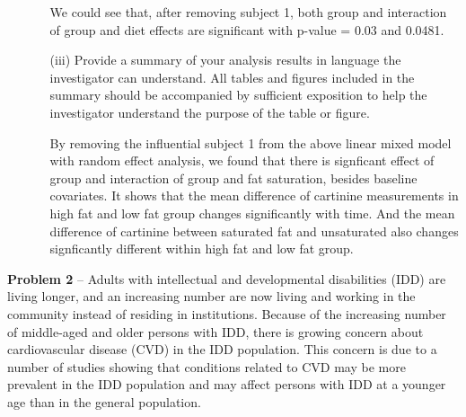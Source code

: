 \begin{itemize}
\begin{itemize}
We could see that, after removing subject 1, both group and interaction of group and diet effects are significant with p-value = 0.03 and 0.0481. 
						
													\vspace{0.2cm}
												  \item[(iii)] Provide a summary of your analysis results in language the investigator can understand. All tables 
																			 and figures included in the summary should be accompanied by sufficient exposition to help the 
																			 investigator understand the purpose of the table or figure. 

By removing the influential subject 1 from the above linear mixed model with random effect analysis, we found that there is signficant effect of group and interaction of group and fat saturation, besides baseline covariates. It shows that the mean difference of cartinine measurements in high fat and low fat group changes significantly with time. And the mean difference of cartinine between saturated fat and unsaturated also changes signficantly different within high fat and low fat group. 

		
											   \end{itemize}								

   \end{itemize}	
				
\newpage


	\noindent \textbf{Problem 2} -- Adults with intellectual and developmental disabilities (IDD) are living longer, and an
																	increasing number are now living and working in the community instead of residing in
																	institutions. Because of the increasing number of middle-aged and older persons with IDD,
																	there is growing concern about cardiovascular disease (CVD) in the IDD population. This
																	concern is due to a number of studies showing that conditions related to CVD may be
																	more prevalent in the IDD population and may affect persons with IDD at a younger age
																	than in the general population. \\
																	
